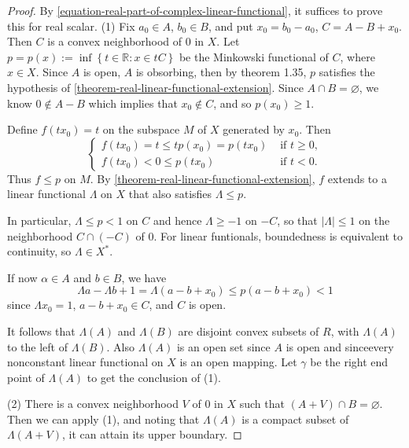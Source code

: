 \begin{proof}
  By \eqref{equation-real-part-of-complex-linear-functional}, it suffices to prove this for real scalar.
  (1) Fix \( a_0 \in A \), \( b_0 \in B \), and put \( x_0 = b_0 - a_0 \), \( C = A - B + x_0 \).
  Then \( C \) is a convex neighborhood of \( 0 \) in \( X \).
  Let \( p = p(x) := \inf \left\lbrace t \in \mathbb{R}: x \in tC \right\rbrace \) be the Minkowski functional of \( C \), where \( x \in X \).
  Since \( A \) is open, \( A \) is obsorbing, then by theorem 1.35, \( p \) satisfies the hypothesis of \ref{theorem-real-linear-functional-extension}.
  Since \( A \cap B = \varnothing \), we know \( 0 \notin A - B \) which implies that \( x_0 \notin C \), and so \( p(x_0) \geq 1 \).

  Define \( f(t x_0) = t \) on the subspace \( M \) of \( X \) generated by \( x_0 \).
  Then
  \[
    \begin{cases}
      f(t x_0) = t \leq t p(x_0) = p(t x_0) & \text{ if } t \geq 0, \\
      f(tx_0) < 0 \leq p(tx_0)              & \text{ if } t < 0.
    \end{cases}
  \]
  Thus \( f \leq p \) on \( M \).
  By \ref{theorem-real-linear-functional-extension}, \( f \) extends to a linear functional \( \Lambda \) on \( X \) that also satisfies \( \Lambda \leq p \).

  In particular, \( \Lambda \leq p < 1 \) on \( C \) and hence \( \Lambda \geq -1 \) on \( -C \), so that \( \left\lvert \Lambda \right\rvert \leq 1 \) on the neighborhood \( C \cap (-C) \) of \( 0 \).
  For linear funtionals, boundedness is equivalent to continuity, so \( \Lambda \in X^* \). %

  If now \( \alpha \in A \) and \( b \in B \), we have
  \[
    \Lambda a - \Lambda b + 1 = \Lambda(a - b + x_0) \leq p(a - b + x_0) < 1
  \]
  since \( \Lambda x_0 = 1 \), \( a - b + x_0 \in C \), and \( C \) is open.

  It follows that \( \Lambda(A) \) and \( \Lambda(B) \) are disjoint convex subsets of \( R \), with \( \Lambda(A) \) to the left of \( \Lambda(B) \).
  Also \( \Lambda(A) \) is an open set since \( A \) is open and sinceevery nonconstant linear functional on \( X \) is an open mapping. %
  Let \( \gamma \) be the right end point of \( \Lambda(A) \) to get the conclusion of (1).

  (2) There is a convex neighborhood \( V \) of \( 0 \) in \( X \) such that \( (A + V) \cap B = \varnothing \). %
  Then we can apply (1), and noting that \( \Lambda(A) \) is a compact subset of \( \Lambda(A + V) \), it can attain its upper boundary.
\end{proof}

